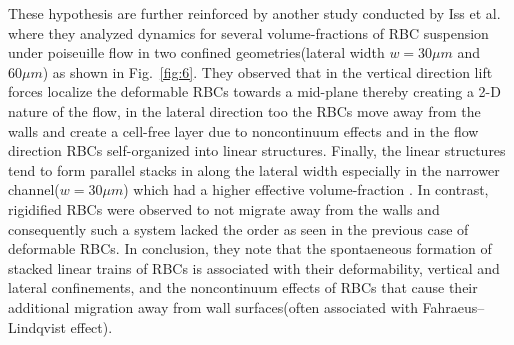These hypothesis are further reinforced by another study conducted by Iss et al. where they analyzed dynamics for several volume-fractions of RBC suspension under poiseuille flow in two confined geometries(lateral width $w=30 \mu m$ and $60 \mu m$)\cite{Reference24} as shown in Fig.~\ref{fig:6}. They observed that in the vertical direction lift forces localize the deformable RBCs towards a mid-plane thereby creating a 2-D nature of the flow, in the lateral direction too the RBCs move away from the walls and create a cell-free layer due to noncontinuum effects\cite{Reference26} and in the flow direction RBCs self-organized into linear structures. Finally, the linear structures tend to form parallel stacks in along the lateral width especially in the narrower channel($w=30 \mu m$) which had a higher effective volume-fraction . In contrast, rigidified RBCs were observed to not migrate away from the walls and consequently such a system lacked the order as seen in the previous case of deformable RBCs. In conclusion, they note that the spontaeneous formation of stacked linear trains of RBCs is associated with their deformability, vertical and lateral confinements, and the noncontinuum effects of RBCs that cause their additional migration away from wall surfaces(often associated with Fahraeus--Lindqvist effect).